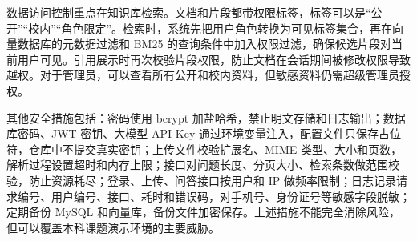 数据访问控制重点在知识库检索。文档和片段都带权限标签，标签可以是“公开”“校内”“角色限定”。检索时，系统先把用户角色转换为可见标签集合，再在向量数据库的元数据过滤和 BM25 的查询条件中加入权限过滤，确保候选片段对当前用户可见。引用展示时再次校验片段权限，防止文档在会话期间被修改权限导致越权。对于管理员，可以查看所有公开和校内资料，但敏感资料仍需超级管理员授权。

其他安全措施包括：密码使用 bcrypt 加盐哈希，禁止明文存储和日志输出；数据库密码、JWT 密钥、大模型 API Key 通过环境变量注入，配置文件只保存占位符，仓库中不提交真实密钥；上传文件校验扩展名、MIME 类型、大小和页数，解析过程设置超时和内存上限；接口对问题长度、分页大小、检索条数做范围校验，防止资源耗尽；登录、上传、问答接口按用户和 IP 做频率限制；日志记录请求编号、用户编号、接口、耗时和错误码，对手机号、身份证号等敏感字段脱敏；定期备份 MySQL 和向量库，备份文件加密保存。上述措施不能完全消除风险，但可以覆盖本科课题演示环境的主要威胁。


